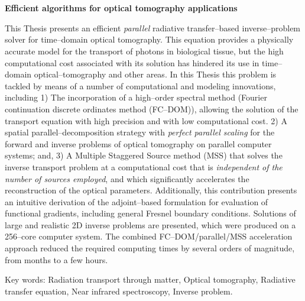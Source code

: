 \pagestyle{empty}
\chapter*{}
\clearpage \pagebreak 
\begin{center}
\begin{large}
\textbf{Efficient algorithms for optical tomography applications}
\end{large}
\end{center}

\vspace{1cm}
This Thesis presents an efficient {\em parallel} radiative
  transfer--based inverse--problem solver for time--domain optical
  tomography. This equation provides a physically
  accurate model for the transport of photons in biological tissue, 
  but the high computational cost associated with its solution has
  hindered its use in time--domain optical--tomography and other
  areas. In this Thesis this problem is tackled by means of a number of 
  computational and modeling innovations, including 
  1) The incorporation of a high--order spectral method 
(Fourier continuation discrete ordinates method (FC--DOM)), 
allowing the solution of the transport equation with 
high precision and with low computational cost.  
  2) A spatial
  parallel--decomposition strategy with \textit{perfect parallel
    scaling} for the forward and inverse problems of optical
  tomography on parallel computer systems; and, 3) A Multiple
  Staggered Source method (MSS) that solves the inverse transport
  problem at a computational cost that is {\em independent of the
    number of sources employed}, and which significantly accelerates
  the reconstruction of the optical parameters. Additionally, this
  contribution presents an intuitive derivation of the
  adjoint--based formulation for evaluation of functional gradients,
  including general Fresnel boundary conditions. Solutions of large and realistic 2D inverse problems are
  presented, which were produced on a 256--core computer
  system. The combined FC--DOM/parallel/MSS acceleration approach reduced the required computing times by several orders of magnitude, from months to a few hours.


\vspace{1cm}
\noindent
Key words: 
Radiation transport through matter,
Optical tomography,
Radiative transfer equation, 
Near infrared spectroscopy, 
Inverse problem.
\pagestyle{empty}
